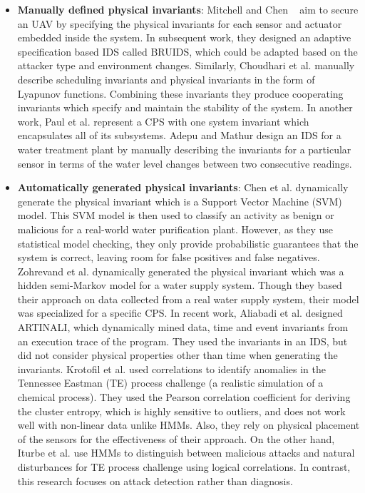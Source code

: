 \begin{itemize}
\item \textbf{Manually defined physical invariants}: Mitchell and Chen ~\cite{mitchell2012specification} aim to secure an UAV  by specifying the physical invariants for each sensor and actuator embedded inside the system. In subsequent work, they designed an adaptive specification based IDS \cite{mitchell2014adaptive} called BRUIDS, which could be adapted based on the attacker type and environment changes. Similarly, Choudhari et al. \cite{choudhari2013stability} manually describe scheduling invariants and physical invariants in the form of Lyapunov functions. Combining these invariants they produce cooperating invariants which specify and maintain the stability of the system. In another work, Paul et al. \cite{paul2014unified} represent a CPS with one system invariant which encapsulates all of its subsystems. Adepu and Mathur \cite{adepu2016using} design an IDS for a water treatment plant by manually describing the invariants for a particular sensor in terms of the water level changes between two consecutive readings.

\item \textbf{Automatically generated physical invariants}: Chen et al. \cite{chen2018learning} dynamically generate the physical invariant which is a Support Vector Machine (SVM) model. This SVM model is then used to classify an activity as benign or malicious for a real-world water purification plant. However, as they use statistical model checking, they only provide probabilistic guarantees that the system is correct, leaving room for false positives and false negatives. Zohrevand et al. \cite{zohrevand2016hidden} dynamically generated the physical invariant which was a hidden semi-Markov model for a water supply system. Though they based their approach on  data collected from a real water supply system, their model was specialized for a specific CPS. In recent work, Aliabadi et al. \cite{aliabadi2017artinali} designed ARTINALI, which dynamically mined data, time and event invariants from an execution trace of the program. They used the invariants in an IDS, but did not consider physical properties other than time when generating the invariants. Krotofil et al. \cite{krotofil2015process} used correlations to identify anomalies in the Tennessee Eastman (TE) process challenge (a realistic simulation of a chemical process). They used the Pearson correlation coefficient for deriving the cluster entropy, which is highly sensitive to outliers, and does not work well with non-linear data unlike HMMs. Also, they rely on physical placement of the sensors for the effectiveness of their approach. On the other hand, Iturbe et al. \cite{iturbe2017feasibility} use HMMs to distinguish between malicious attacks and natural disturbances for TE process challenge using logical correlations. In contrast, this research focuses on attack detection rather than diagnosis. 
\end{itemize}

